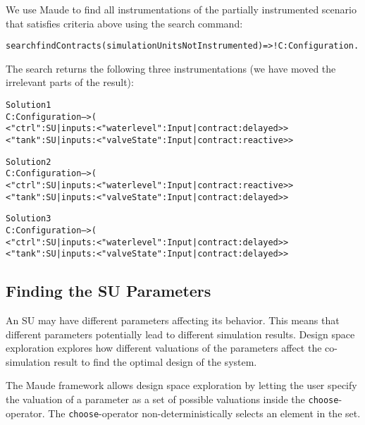 \begin{example}
We use Maude to find all instrumentations of the partially instrumented scenario that satisfies criteria above using the search command: 

\small
\begin{alltt}
search findContracts(simulationUnitsNotInstrumented) =>! C:Configuration .
\end{alltt}

The search returns the following three instrumentations (we have moved the irrelevant parts of the result):

\begin{alltt}
Solution 1
C:Configuration --> (
< "ctrl" : SU | inputs : < "waterlevel" : Input | contract : delayed > >
< "tank" : SU | inputs : < "valveState" : Input | contract : reactive > >

Solution 2
C:Configuration --> (
< "ctrl" : SU | inputs : < "waterlevel" : Input | contract : reactive > >
< "tank" : SU | inputs : < "valveState" : Input | contract : delayed > >

Solution 3
C:Configuration --> (
< "ctrl" : SU | inputs : < "waterlevel" : Input | contract : delayed > >
< "tank" : SU | inputs : < "valveState" : Input | contract : delayed > >

\end{alltt}
\normalsize

\end{example}

\subsection{Finding the SU Parameters}
An SU may have different parameters affecting its behavior.
This means that different parameters potentially lead to different simulation results.
Design space exploration explores how different valuations of the parameters affect the co-simulation result to find the optimal design of the system. 

The Maude framework allows design space exploration by letting the user specify the valuation of a parameter as a set of possible valuations inside the \texttt{choose}-operator.
The \texttt{choose}-operator non-deterministically selects an element in the set.

